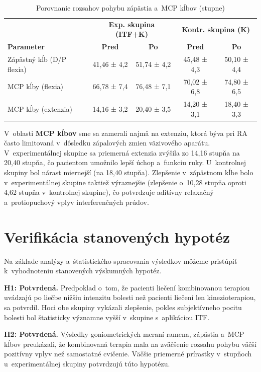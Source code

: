 \begin{table}[H]
    \centering
    \caption{Porovnanie rozsahov pohybu zápästia a~MCP kĺbov (stupne)}
    \label{tab:vysledky_ruka}
    \begin{tabular}{lcccc}
        \toprule
         & \multicolumn{2}{c}{\textbf{Exp. skupina (ITF+K)}} & \multicolumn{2}{c}{\textbf{Kontr. skupina (K)}} \\
        \textbf{Parameter} & \textbf{Pred} & \textbf{Po} & \textbf{Pred} & \textbf{Po} \\
        \midrule
        Zápästný kĺb (D/P flexia) & 41,46 ± 4,2 & 51,74 ± 4,2 & 45,48 ± 4,3 & 50,10 ± 4,4 \\
        MCP kĺby (flexia) & 66,78 ± 7,4 & 76,48 ± 7,1 & 70,02 ± 6,8 & 74,80 ± 6,5 \\
        MCP kĺby (extenzia) & 14,16 ± 3,2 & 20,40 ± 3,5 & 14,20 ± 3,1 & 18,40 ± 3,3 \\
        \bottomrule
    \end{tabular}
\end{table}

V~oblasti \textbf{MCP kĺbov} sme sa zamerali najmä na extenziu, ktorá býva pri RA často limitovaná v~dôsledku zápalových zmien väzivového aparátu. V~experimentálnej skupine sa priemerná extenzia zvýšila zo 14,16 stupňa na 20,40 stupňa, čo pacientom umožnilo lepší úchop a~funkciu ruky. U~kontrolnej skupiny bol nárast miernejší (na 18,40 stupňa). Zlepšenie v~zápästnom kĺbe bolo v~experimentálnej skupine taktiež výraznejšie (zlepšenie o~10,28 stupňa oproti 4,62 stupňa v~kontrolnej skupine), čo potvrdzuje aditívny relaxačný a~protiopuchový vplyv interferenčných prúdov.

\section{Verifikácia stanovených hypotéz}

Na základe analýzy a~štatistického spracovania výsledkov môžeme pristúpiť k~vyhodnoteniu stanovených výskumných hypotéz.

\textbf{H1: Potvrdená.} Predpoklad o~tom, že pacienti liečení kombinovanou terapiou uvádzajú po liečbe nižšiu intenzitu bolesti než pacienti liečení len kinezioterapiou, sa potvrdil. Hoci obe skupiny vykázali zlepšenie, pokles subjektívneho pocitu bolesti bol štatisticky významne vyšší v~skupine s~aplikáciou ITF.

\textbf{H2: Potvrdená.} Výsledky goniometrických meraní ramena, zápästia a~MCP kĺbov preukázali, že kombinovaná terapia mala na zväčšenie rozsahu pohybu väčší pozitívny vplyv než samostatné cvičenie. Väčšie priemerné prírastky v~stupňoch u~experimentálnej skupiny potvrdzujú túto hypotézu.

